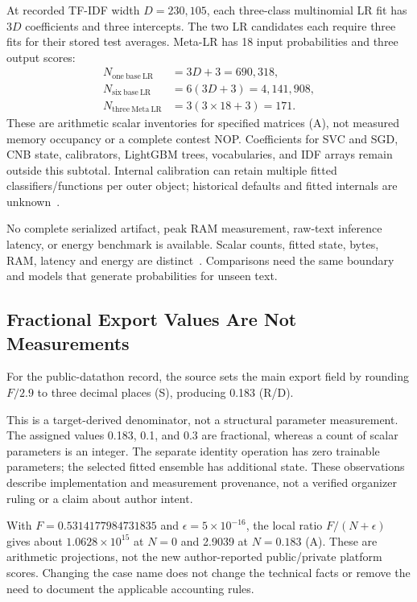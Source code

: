 \documentclass[doublecolumn]{ijcvsplatex}
\newif\ifNamedCase
\newcommand{\CompetitionName}{\ifNamedCase the HerWILL AI for Digital Safety Datathon 2026\else a public datathon\fi}
\begin{document}
At recorded TF-IDF width $D=230{,}105$, each three-class multinomial LR fit has $3D$ coefficients and three intercepts. The two LR candidates each require three fits for their stored test averages. Meta-LR has 18 input probabilities and three output scores:
\begin{equation}
\begin{aligned}
N_{\mathrm{one\ base\ LR}}&=3D+3=690{,}318,\\
N_{\mathrm{six\ base\ LR}}&=6(3D+3)=4{,}141{,}908,\\
N_{\mathrm{three\ Meta\ LR}}&=3(3\times18+3)=171.
\end{aligned}
\label{eq:counts}
\end{equation}
These are arithmetic scalar inventories for specified matrices (A), not measured memory occupancy or a complete contest NOP. Coefficients for SVC and SGD, CNB state, calibrators, LightGBM trees, vocabularies, and IDF arrays remain outside this subtotal. Internal calibration can retain multiple fitted classifiers/functions per outer object; historical defaults and fitted internals are unknown~\cite{pedregosa2011scikit}.

No complete serialized artifact, peak RAM measurement, raw-text inference latency, or energy benchmark is available. Scalar counts, fitted state, bytes, RAM, latency and energy are distinct~\cite{henderson2020systematic}. Comparisons need the same boundary and models that generate probabilities for unseen text.

\subsection{Fractional Export Values Are Not Measurements}
\ifNamedCase
For the named \CompetitionName\ record, the source sets the main export field by rounding $F/2.9$ to three decimal places (S), producing 0.183 (R/D).
\else
For the public-datathon record, the source sets the main export field by rounding $F/2.9$ to three decimal places (S), producing 0.183 (R/D).
\fi
This is a target-derived denominator, not a structural parameter measurement. The assigned values 0.183, 0.1, and 0.3 are fractional, whereas a count of scalar parameters is an integer. The separate identity operation has zero trainable parameters; the selected fitted ensemble has additional state. These observations describe implementation and measurement provenance, not a verified organizer ruling or a claim about author intent.

With $F=0.5314177984731835$ and $\epsilon=5\times10^{-16}$, the local ratio $F/(N+\epsilon)$ gives about $1.0628\times10^{15}$ at $N=0$ and 2.9039 at $N=0.183$ (A). These are arithmetic projections, not the new author-reported public/private platform scores. Changing the case name does not change the technical facts or remove the need to document the applicable accounting rules.
\end{document}
